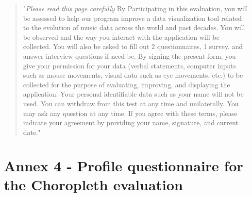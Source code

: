 \documentclass[twocolumn, letterpaper,13pt]{scrartcl}
\begin{document}
    \begin{quote}
        "\textit{Please read this page carefully}
        \newline\newline
        By Participating in this evaluation, you will be assessed to help our program improve a data visualization tool related to the evolution of music data across the world and past decades. You will be observed and the way you interact with the application will be collected. You will also be asked to fill out 2 questionnaires, 1 survey, and answer interview questions if need be.
        \newline\newline
        By signing the present form, you give your permission for your data (verbal statements, computer inputs such as mouse movements, visual data such as eye movements, etc.) to be collected for the purpose of evaluating, improving, and displaying the application. Your personal identifiable data such as your name will not be used.
        \newline\newline
        You can withdraw from this test at any time and unilaterally. You may ask any question at any time.
        \newline\newline
        If you agree with these terms, please indicate your agreement by providing your name, signature, and current date."
    \end{quote}
    
    \section*{Annex 4 - Profile questionnaire for the Choropleth evaluation}
    
\end{document}
